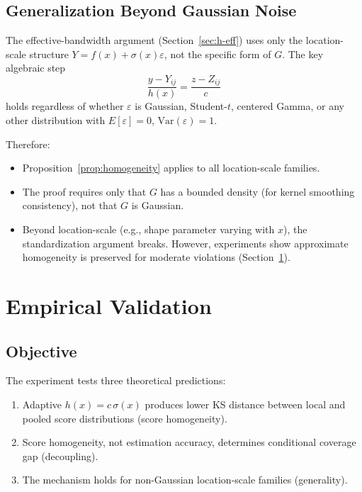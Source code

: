 \documentclass[11pt]{article}
\theoremstyle{remark}
\begin{document}
\subsection{Generalization Beyond Gaussian Noise}
\label{sec:beyond-gaussian}

The effective-bandwidth argument (Section~\ref{sec:h-eff}) uses only the
location-scale structure $Y = f(x) + \sigma(x)\varepsilon$, not the
specific form of $G$. The key algebraic step
\[
  \frac{y - Y_{ij}}{h(x)} = \frac{z - Z_{ij}}{c}
\]
holds regardless of whether $\varepsilon$ is Gaussian, Student-$t$,
centered Gamma, or any other distribution with $E[\varepsilon] = 0$,
$\mathrm{Var}(\varepsilon) = 1$.

Therefore:
\begin{itemize}
  \item Proposition~\ref{prop:homogeneity} applies to all
    location-scale families.
  \item The proof requires only that $G$ has a bounded density (for
    kernel smoothing consistency), not that $G$ is Gaussian.
  \item Beyond location-scale (e.g., shape parameter varying with $x$),
    the standardization argument breaks. However, experiments show
    approximate homogeneity is preserved for moderate violations
    (Section~\ref{sec:exp-design}).
\end{itemize}


\section{Empirical Validation}
\label{sec:exp-design}

\subsection{Objective}

The experiment tests three theoretical predictions:
\begin{enumerate}
  \item Adaptive $h(x) = c\,\sigma(x)$ produces lower KS distance
    between local and pooled score distributions (score homogeneity).
  \item Score homogeneity, not estimation accuracy, determines
    conditional coverage gap (decoupling).
  \item The mechanism holds for non-Gaussian location-scale families
    (generality).
\end{enumerate}
\end{document}

